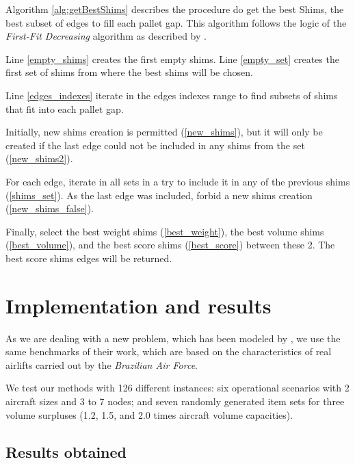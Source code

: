 \documentclass[preprint,authoryear]{elsarticle}
\begin{document}
Algorithm \ref{alg:getBestShims} describes the procedure do get the best Shims, the best subset of edges to fill each pallet gap. This algorithm follows the logic of the {\it First-Fit Decreasing} algorithm as described by \cite{JohnsonGarey1985}.

Line \ref{empty_shims} creates the first empty shims.
Line \ref{empty_set} creates the first set of shims from where the best shims will be chosen.

Line \ref{edges_indexes} iterate in the edges indexes range to find subsets of shims that fit into each pallet gap.

Initially, new shims creation is permitted (\ref{new_shims}), but it will only be created if the last edge could not be included in any shims from the set (\ref{new_shims2}). 

For each edge, iterate in all sets in a try to include it in any of the previous shims (\ref{shims_set}).
As the last edge was included, forbid a new shims creation (\ref{new_shims_false}).

Finally, select the best weight shims (\ref{best_weight}), the best volume shims (\ref{best_volume}), and the best score shims (\ref{best_score}) between these 2. The best score shims edges will be returned.

\section{Implementation and results}
\label{sec6}


As we are dealing with a new problem, which has been modeled by \cite{MesquitaSanches2023}, we use the same benchmarks of their work, which are based on the characteristics of real airlifts carried out by the {\em Brazilian Air Force}.
 
We test our methods with 126 different instances: six operational scenarios with 2 aircraft sizes and 3 to 7 nodes; and seven randomly generated item sets for three volume surpluses (1.2, 1.5, and 2.0 times aircraft volume capacities).


\subsection{Results obtained}


\end{document}
